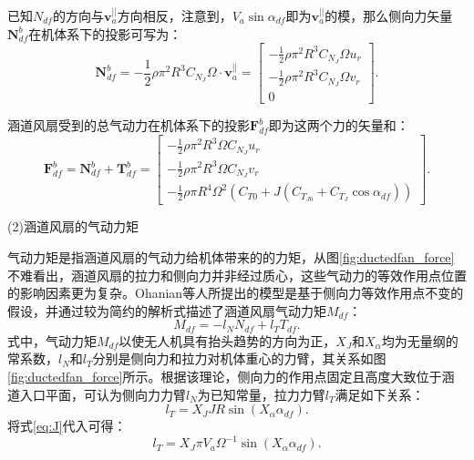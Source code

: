 已知$N_{df}$的方向与$\bm{v}_a^{||}$方向相反，注意到，$V_a \sin\alpha_{df}$即为$\bm{v}_a^{||}$的模，那么侧向力矢量$\bm{N}_{df}^b$在机体系下的投影可写为：
\begin{equation}
    \bm{N}_{df}^b = -\frac{1}{2}\rho \pi^2 R^3 C_{N_J} \Omega \cdot \bm{v}_a^{||} = 
    \begin{bmatrix}
        -\frac{1}{2}\rho \pi^2 R^3 C_{N_J} \Omega u_r \\
        -\frac{1}{2}\rho \pi^2 R^3 C_{N_J} \Omega v_r \\
        0
    \end{bmatrix}.
    \label{eq:N_df}
\end{equation}

涵道风扇受到的总气动力在机体系下的投影$\bm{F}_{df}^b$即为这两个力的矢量和：
\begin{equation}
    \bm{F}_{df}^b = \bm{N}_{df}^b + \bm{T}_{df}^b =
    \begin{bmatrix}
        -\frac{1}{2}\rho \pi^2 R^3 \Omega C_{N_J} u_r \\
        -\frac{1}{2}\rho \pi^2 R^3 \Omega C_{N_J} v_r \\
        -\frac{1}{2}\rho \pi R^4 \Omega^2 (C_{T0} + J (C_{T_{J0}} + C_{T_J} \cos\alpha_{df}))
    \end{bmatrix}.
\end{equation}

(2)涵道风扇的气动力矩

气动力矩是指涵道风扇的气动力给机体带来的的力矩，从图\ref{fig:ductedfan_force}不难看出，涵道风扇的拉力和侧向力并非经过质心，这些气动力的等效作用点位置的影响因素更为复杂。Ohanian等人所提出的模型是基于侧向力等效作用点不变的假设\cite{2012Nondimensional}，并通过较为简约的解析式描述了涵道风扇气动力矩$M_{df}$：
\begin{equation}
    M_{df} = -l_N N_{df} + l_T T_{df}.
\end{equation}
式中，气动力矩$M_{df}$以使无人机具有抬头趋势的方向为正，$X_J$和$X_{\alpha}$均为无量纲的常系数，$l_N$和$l_T$分别是侧向力和拉力对机体重心的力臂，其关系如图\ref{fig:ductedfan_force}所示。根据该理论，侧向力的作用点固定且高度大致位于涵道入口平面，可认为侧向力力臂$l_N$为已知常量，拉力力臂$l_T$满足如下关系：
\begin{equation}
    l_T = X_J J R \sin(X_\alpha \alpha_{df}).
\end{equation}
将式\eqref{eq:J}代入可得：
\begin{equation}
    l_T = X_J \pi V_a \Omega ^{-1} \sin(X_\alpha \alpha_{df}).
    \label{eq:l_T}
\end{equation}

